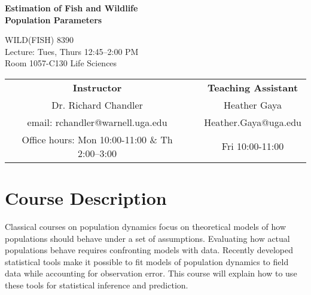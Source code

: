\documentclass[12pt]{article}
\begin{document}

{\centering

{\Large \bf \sc
  Estimation of Fish and Wildlife \\ Population Parameters \\
}
\vspace{6pt}

WILD(FISH) 8390  \\
Lecture: Tues, Thurs 12:45--2:00 PM \\
Room 1057-C130 Life Sciences \\


\normalsize

\vspace{12pt}

\begin{tabular}[h!]{ccc}
\textbf{Instructor}                 & \hspace{0.01cm} & \textbf{Teaching Assistant} \\
Dr. Richard Chandler                & & Heather Gaya\\
email: rchandler@warnell.uga.edu    & & Heather.Gaya@uga.edu \\
Office hours: Mon 10:00-11:00 \& Th 2:00--3:00 & & Fri 10:00-11:00 \\
\end{tabular}


}



\normalsize


\vspace{-4mm}
\section*{\normalsize Course Description}
\vspace{-4mm}
Classical courses on population dynamics focus on theoretical models 
of how populations should behave under a set of assumptions.
Evaluating how actual populations behave requires confronting models
with data. Recently developed statistical tools make it possible to fit
models of population dynamics to field data while accounting for
observation error. This course will explain how to use these tools for
statistical inference and prediction.  
\end{document}
